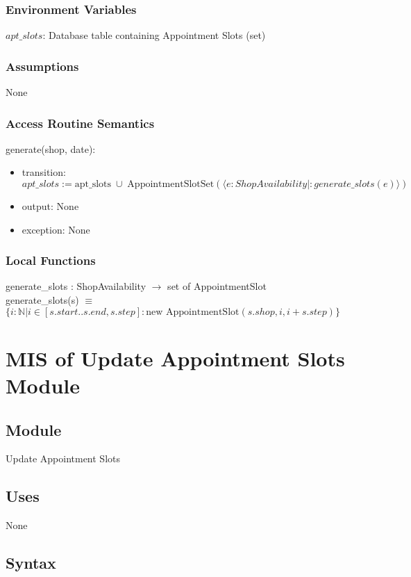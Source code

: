 \documentclass[12pt, titlepage]{article}
\begin{document}
\subsubsection{Environment Variables}
$apt\_slots$: Database table containing Appointment Slots (set)

\subsubsection{Assumptions}
None

\subsubsection{Access Routine Semantics}
\noindent generate(shop, date):
\begin{itemize}
\item transition: \\
$apt\_slots := \text{apt\_slots} \; \cup \; \text{AppointmentSlotSet}(\langle e: ShopAvailability |: generate\_slots(e) \rangle)$
\item output: None
\item exception: None
\end{itemize}

\subsubsection{Local Functions}
generate\_slots : ShopAvailability $\rightarrow$ set of AppointmentSlot \\
generate\_slots(s) $\equiv$ $\{i:\mathbb{N}| i \in [s.start..s.end, s.step] : \text{new AppointmentSlot}(s.shop, i, i+s.step) \}$

\newpage

\section{MIS of Update Appointment Slots Module} \label{mUpdateAppointmentSlots}

\subsection{Module}
Update Appointment Slots

\subsection{Uses}
None

\subsection{Syntax}
\end{document}

